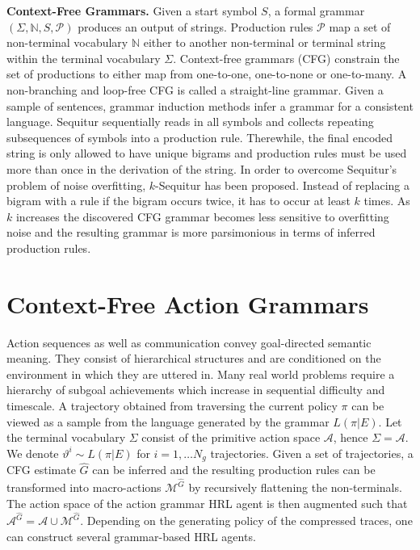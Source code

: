 \documentclass[10pt,letterpaper]{article}
\begin{document}
\textbf{Context-Free Grammars.} Given a start symbol $S$, a formal grammar $(\Sigma, \mathbb{N}, S, \mathcal{P})$ produces an output of strings. Production rules $\mathcal{P}$ map a set of non-terminal vocabulary $\mathbb{N}$ either to another non-terminal or terminal string within the terminal vocabulary $\Sigma$.
Context-free grammars (CFG) \cite{Chomsky_1959a} constrain the set of productions to either map from one-to-one, one-to-none or one-to-many. A non-branching and loop-free CFG is called a straight-line grammar. Given a sample of sentences, grammar induction methods infer a grammar for a consistent language.
Sequitur \cite{Manning_1997} sequentially reads in all symbols and collects repeating subsequences of symbols into a production rule. Therewhile, the final encoded string is only allowed to have unique bigrams and production rules must be used more than once in the derivation of the string.
In order to overcome Sequitur's problem of noise overfitting, $k$-Sequitur \cite{Stout_2018} has been proposed. Instead of replacing a bigram with a rule if the bigram occurs twice, it has to occur at least $k$ times. As $k$ increases the discovered CFG grammar becomes less sensitive to overfitting noise and the resulting grammar is more parsimonious in terms of inferred production rules. 

\section{Context-Free Action Grammars}

Action sequences as well as communication convey goal-directed semantic meaning. They consist of hierarchical structures and are conditioned on the environment in which they are uttered in. 
Many real world problems require a hierarchy of subgoal achievements which increase in sequential difficulty and timescale.
A trajectory obtained from traversing the current policy $\pi$ can be viewed as a sample from the language generated by the grammar $L(\pi|E)$. Let the terminal vocabulary $\Sigma$ consist of the primitive action space $\mathcal{A}$, hence $\Sigma = \mathcal{A}$. We denote  $\vartheta^i \sim L(\pi|E)$ for $i = 1, \dots N_g$ trajectories. Given a set of trajectories, a CFG estimate $\hat{G}$ can be inferred and the resulting production rules can be transformed into macro-actions $\mathcal{M}^{\hat{G}}$ by recursively flattening the non-terminals. The action space of the action grammar HRL agent is then augmented such that $\mathcal{A}^{\hat{G}} = \mathcal{A} \cup \mathcal{M}^{\hat{G}}$. Depending on the generating policy of the compressed traces, one can construct several grammar-based HRL agents.
\end{document}
